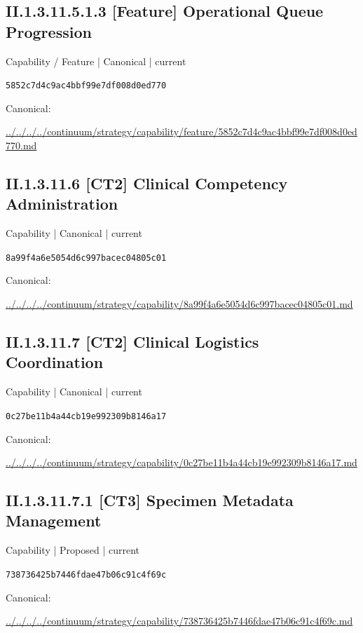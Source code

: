 \documentclass[10pt,a4paper]{article}
\begin{document}
\subsection*{II.1.3.11.5.1.3 [Feature] Operational Queue Progression}
{\small Capability / Feature | Canonical | current}\par
\texttt{5852c7d4c9ac4bbf99e7df008d0ed770}\par
Canonical: \par
{\footnotesize\url{../../../../continuum/strategy/capability/feature/5852c7d4c9ac4bbf99e7df008d0ed770.md}}\par
\subsection*{II.1.3.11.6 [CT2] Clinical Competency Administration}
{\small Capability | Canonical | current}\par
\texttt{8a99f4a6e5054d6c997bacec04805c01}\par
Canonical: \par
{\footnotesize\url{../../../../continuum/strategy/capability/8a99f4a6e5054d6c997bacec04805c01.md}}\par
\subsection*{II.1.3.11.7 [CT2] Clinical Logistics Coordination}
{\small Capability | Canonical | current}\par
\texttt{0c27be11b4a44cb19e992309b8146a17}\par
Canonical: \par
{\footnotesize\url{../../../../continuum/strategy/capability/0c27be11b4a44cb19e992309b8146a17.md}}\par
\subsection*{II.1.3.11.7.1 [CT3] Specimen Metadata Management}
{\small Capability | Proposed | current}\par
\texttt{738736425b7446fdae47b06c91c4f69c}\par
Canonical: \par
{\footnotesize\url{../../../../continuum/strategy/capability/738736425b7446fdae47b06c91c4f69c.md}}\par
\end{document}
